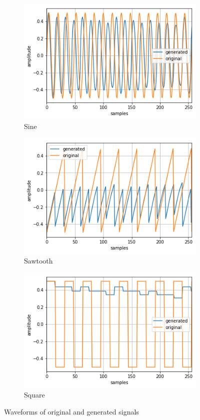 \documentclass[conference]{IEEEtran}
\begin{document}
\begin{figure}[!t]
\begin{subfigure}{0.5\textwidth}
  \centering
  \includegraphics[width=.8\linewidth]{Images/sine_gen}
  \caption{Sine}
  \label{fig:sfig1}
\end{subfigure}
\begin{subfigure}{0.5\textwidth}
  \centering
  \includegraphics[width=.8\linewidth]{Images/saw_gen}
  \caption{Sawtooth}
  \label{fig:sfig2}
\end{subfigure}
\begin{subfigure}{0.5\textwidth}
  \centering
  \includegraphics[width=.8\linewidth]{Images/square_gen}
  \caption{Square}
  \label{fig:sfig3}
\end{subfigure}
\caption{Waveforms of original and generated signals}
\label{fig:waveforms}
\end{figure}
\end{document}
